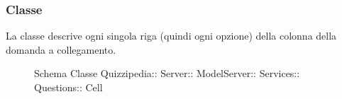 \subsubsection{Classe }
La classe descrive ogni singola riga (quindi ogni opzione) della colonna della domanda a collegamento.
\begin{figure}[H]
\centering
\noindent{}
\caption[Schema Classe Cell]{Schema Classe Quizzipedia:: Server:: ModelServer:: Services:: Questions:: Cell}
\end{figure}
